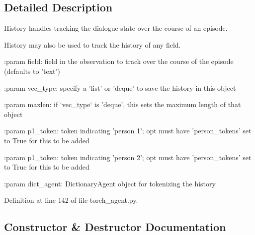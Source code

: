 \subsection{Detailed Description}
\begin{DoxyVerb}History handles tracking the dialogue state over the course of an episode.

History may also be used to track the history of any field.

:param field:
    field in the observation to track over the course of the episode
    (defaults to 'text')

:param vec_type:
    specify a 'list' or 'deque' to save the history in this object

:param maxlen:
    if `vec_type` is 'deque', this sets the maximum length of that object

:param p1_token:
    token indicating 'person 1'; opt must have 'person_tokens' set to True
    for this to be added

:param p1_token:
    token indicating 'person 2'; opt must have 'person_tokens' set to True
    for this to be added

:param dict_agent:
    DictionaryAgent object for tokenizing the history
\end{DoxyVerb}
 

Definition at line 142 of file torch\+\_\+agent.\+py.



\subsection{Constructor \& Destructor Documentation}
\mbox{\label{classparlai_1_1core_1_1torch__agent_1_1History_af2670eff50563dcee5da6581355e758f}} 
